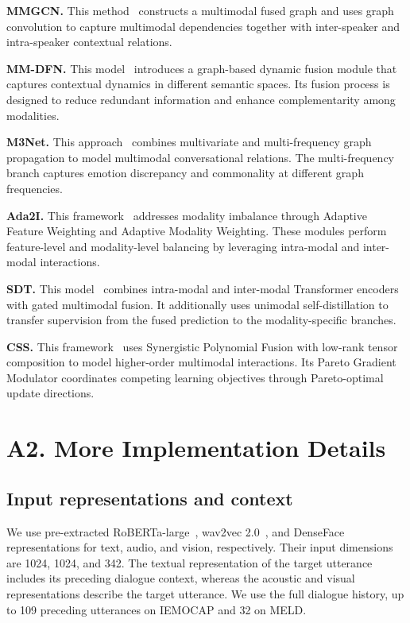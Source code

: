 \documentclass[letterpaper]{article} %
\begin{document}
\noindent\textbf{MMGCN.}
This method~\cite{mmgcn} constructs a multimodal fused graph and uses
graph convolution to capture multimodal dependencies together with
inter-speaker and intra-speaker contextual relations.

\noindent\textbf{MM-DFN.}
This model~\cite{mmdfn} introduces a graph-based dynamic fusion module
that captures contextual dynamics in different semantic spaces. Its
fusion process is designed to reduce redundant information and enhance
complementarity among modalities.

\noindent\textbf{M3Net.}
This approach~\cite{m3net} combines multivariate and multi-frequency
graph propagation to model multimodal conversational relations. The
multi-frequency branch captures emotion discrepancy and commonality at
different graph frequencies.

\noindent\textbf{Ada2I.}
This framework~\cite{ada2i} addresses modality imbalance through
Adaptive Feature Weighting and Adaptive Modality Weighting. These
modules perform feature-level and modality-level balancing by
leveraging intra-modal and inter-modal interactions.

\noindent\textbf{SDT.}
This model~\cite{sdt} combines intra-modal and inter-modal Transformer
encoders with gated multimodal fusion. It additionally uses unimodal
self-distillation to transfer supervision from the fused prediction
to the modality-specific branches.

\noindent\textbf{CSS.}
This framework~\cite{css} uses Synergistic Polynomial Fusion with
low-rank tensor composition to model higher-order multimodal
interactions. Its Pareto Gradient Modulator coordinates competing
learning objectives through Pareto-optimal update directions.

\section{A2. More Implementation Details}

\subsection{Input representations and context}
We use pre-extracted RoBERTa-large~\cite{liu2019roberta}, wav2vec
2.0~\cite{baevski2020wav2vec}, and DenseFace~\cite{zhao2018emotion}
representations for text, audio, and vision, respectively. Their input
dimensions are 1024, 1024, and 342. The textual representation of the
target utterance includes its preceding dialogue context, whereas the
acoustic and visual representations describe the target utterance. We
use the full dialogue history, up to 109 preceding utterances on
IEMOCAP and 32 on MELD.
\end{document}
